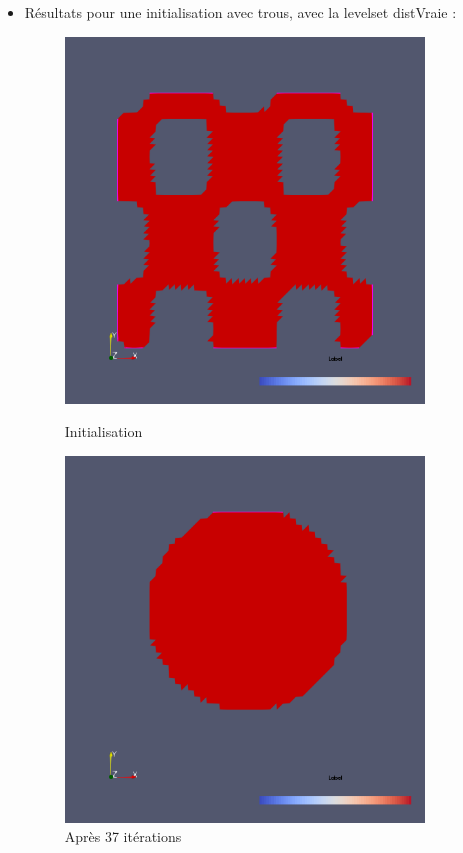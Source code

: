 \documentclass[11pt,a4paper]{article}
\begin{document}
\begin{itemize}
	\item Résultats pour une initialisation avec trous, avec la levelset distVraie :
	\begin{figure}[H]
		\label{fig:trous}
		\begin{minipage}{0.45\textwidth}
			\includegraphics[width=0.9\textwidth]{SansEl2DdistVraieiniTrouINI.png}
			\caption{Initialisation}
		\end{minipage}	
		\begin{minipage}{0.45\textwidth}
			\includegraphics[width=0.9\textwidth]{SansEl2DdistVraieiniTrouResit37.png}
			\caption{Après 37 itérations}
		\end{minipage}
	\end{figure}	
	

\end{itemize}
\end{document}

